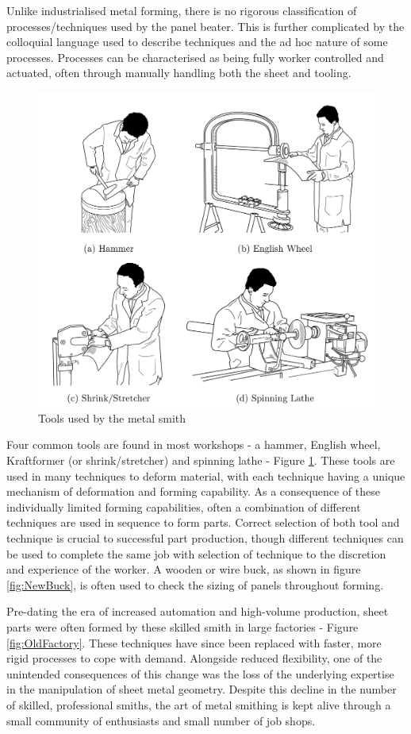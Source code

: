 Unlike industrialised metal forming, there is no rigorous classification of processes/techniques used by the panel beater. This is further complicated by the colloquial language used to describe techniques and the ad hoc nature of some processes. Processes can be characterised as being fully worker controlled and actuated, often through manually handling both the sheet and tooling.

\begin{figure}[h]
    \centering
    \includegraphics[width=0.8\linewidth]{Diagrams/Drawings.pdf}
    \caption{Tools used by the metal smith}
    \label{fig:Drawings}
\end{figure}

Four common tools are found in most workshops - a hammer, English wheel, Kraftformer (or shrink/stretcher) and spinning lathe - Figure \ref{fig:Drawings}. These tools are used in many techniques to deform material, with each technique having a unique mechanism of deformation and forming capability. As a consequence of these individually limited forming capabilities, often a combination of different techniques are used in sequence to form parts. Correct selection of both tool and technique is crucial to successful part production, though different techniques can be used to complete the same job with selection of technique to the discretion and experience of the worker. A wooden or wire buck, as shown in figure \ref{fig:NewBuck}, is often used to check the sizing of panels throughout forming.

Pre-dating the era of increased automation and high-volume production, sheet parts were often formed by these skilled smith in large factories - Figure \ref{fig:OldFactory}. These techniques have since been replaced with faster, more rigid processes to cope with demand. Alongside reduced flexibility, one of the unintended consequences of this change was the loss of the underlying expertise in the manipulation of sheet metal geometry.  Despite this decline in the number of skilled, professional smiths, the art of metal smithing is kept alive through a small community of enthusiasts and small number of job shops. 

